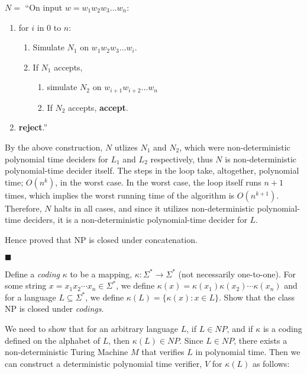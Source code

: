 \documentclass[addpoints,a4paper]{exam}
\begin{document}
\begin{questions}
\begin{solution}
    $ N = $ ``On input $w = w_1 w_2 w_3 ... w_n$: \vspace*{-2mm}
    \begin{enumerate}
      \item for $i$ in 0 to $n$: \vspace*{-2mm} \begin{enumerate}
        \item Simulate $N_1$ on $ w_1w_2w_3...w_i $. \vspace*{-1mm}
        \item If $N_1$ accepts, \vspace*{-1mm} \begin{enumerate}
          \item simulate $N_2$ on $ w_{i + 1}w_{i + 2}...w_n $ \vspace*{-1mm}
          \item If $N_2$ accepts, \textbf{accept}. \vspace*{-1mm}
        \end{enumerate}
      \end{enumerate}
      \item \textbf{reject}.''
    \end{enumerate}

    By the above construction, $N$ utlizes $N_1$ and $N_2$, which were non-deterministic polynomial time deciders for $L_1$ and $L_2$ respectively, thus $N$ is non-deterministic polynomial-time decider itself. The steps in the loop take, altogether, polynomial time; $ O(n^k) $, in the worst case. In the worst case, the loop itself runs $n + 1$ times, which implies the worst running time of the algorithm is $ O(n^{k + 1}) $. Therefore, $N$ halts in all cases, and since it utilizes non-deterministic polynomial-time deciders, it is a non-deterministic polynomial-time decider for $L$.

    Hence proved that NP is closed under concatenation. \vspace*{-3mm}
    \begin{flushright}
      $ \blacksquare $
    \end{flushright}
  \end{solution}

  \question[25] Define a \textit{coding} $\kappa$ to be a mapping,  $\kappa:\Sigma^*\rightarrow \Sigma^*$ (not necessarily one-to-one). For some string $x = x_1x_2\cdots x_n\in\Sigma^*$, we define $\kappa(x) = \kappa(x_1)\kappa(x_2)\cdots\kappa(x_n)$ and for a language $L\subseteq \Sigma^*$, we define $\kappa(L) = \{\kappa(x): x\in L \}$. Show that the class NP is closed under \textit{codings}.
  \begin{solution}
    We need to show that for an arbitrary language $L$, if $ L \in NP $, and if $ \kappa $ is a coding defined on the alphabet of $L$, then $ \kappa(L) \in NP $. Since $L \in NP$, there exists a non-deterministic Turing Machine $M$ that verifies $L$ in polynomial time. Then we can construct a deterministic polynomial time verifier, $V$ for $ \kappa (L) $ as follows:


\end{solution}
\end{questions}
\end{document}
